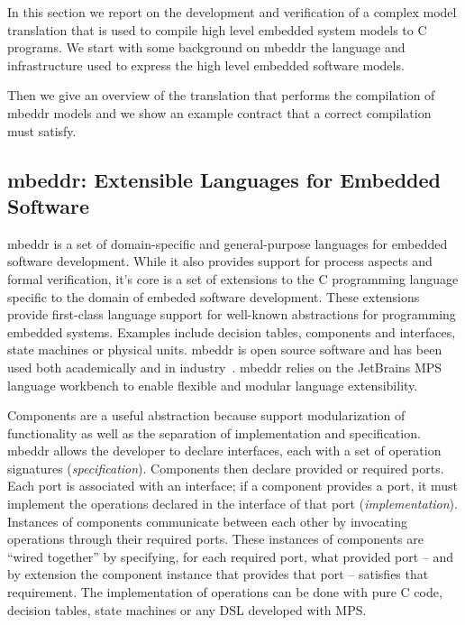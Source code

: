 
In this section we report on the development and verification of a complex model
translation that is used to compile high level embedded
system models to C programs. We start with some background on mbeddr the
language and infrastructure used to express the high level embedded software
models. 

Then we give an overview of the translation that performs the compilation of
mbeddr models and we show an example contract that a correct compilation must
satisfy. 

\subsection{mbeddr: Extensible Languages for Embedded Software}

mbeddr\cite{Voelter:2012:MEC:2384716.2384767} is a set of domain-specific and
general-purpose languages for embedded software development. While it also
provides support for process aspects and formal verification, it's core is a set
of extensions to the C programming language specific to the domain of embeded
software development. These extensions provide first-class language support for
well-known abstractions for programming embedded systems. Examples include
decision tables, components and interfaces, state machines or physical units.
mbeddr is open source software and has been used both academically and in
industry~\cite{Voelter2013,Voelter2014,mry_et_al:DR:2014:454,mbeddrSM}. mbeddr
relies on the JetBrains MPS language workbench to enable flexible and modular
language extensibility.

Components are a useful abstraction because support modularization of
functionality as well as the separation of implementation and specification.
mbeddr allows the developer to declare interfaces, each with a set of operation
signatures (\emph{specification}). Components then declare provided or required
ports. Each port is associated with an interface; if a component provides a
port, it must implement the operations declared in the interface of that port
(\emph{implementation}). Instances of components communicate between each other
by invocating operations through their required ports. These instances of
components are ``wired together'' by specifying, for each required port, what
provided port -- and by extension the component instance that provides that port
-- satisfies that requirement.
The implementation of operations can be done with pure C code, decision tables,
state machines or any DSL developed with MPS.

